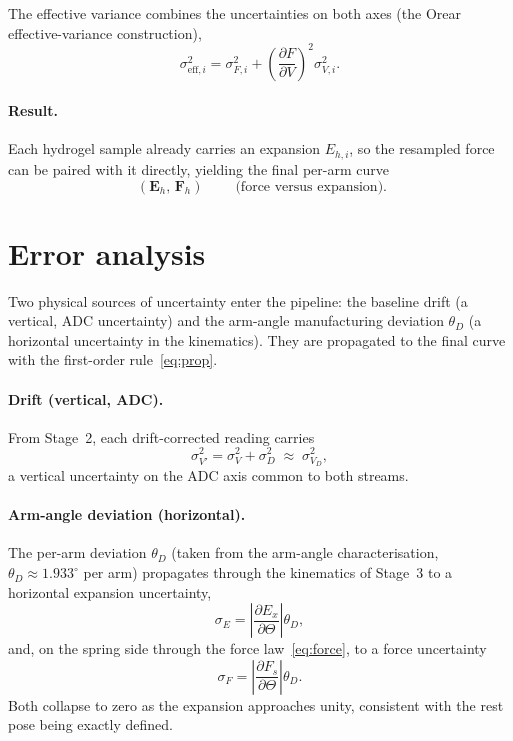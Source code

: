 \documentclass[11pt]{article}
\newcommand{\dset}[1]{\mathbf{#1}}          %
\newcommand{\unc}[1]{\sigma_{#1}}           %
\begin{document}
The effective variance combines the uncertainties on both axes (the Orear effective-variance
construction),
\begin{equation}
\sigma_{\mathrm{eff},i}^2=\sigma_{F,i}^2+\left(\frac{\partial F}{\partial V}\right)^{\!2}\sigma_{V,i}^2 .
\label{eq:seff}
\end{equation}

\paragraph{Result.}
Each hydrogel sample already carries an expansion $E_{h,i}$, so the resampled force can be
paired with it directly, yielding the final per-arm curve
\begin{equation}
\boxed{\;(\dset{E}_h,\,\dset{F}_h)\;}\qquad\text{(force versus expansion).}
\end{equation}

\section{Error analysis}
\label{sec:errors}
Two physical sources of uncertainty enter the pipeline: the baseline drift (a vertical, ADC
uncertainty) and the arm-angle manufacturing deviation $\theta_D$ (a horizontal uncertainty
in the kinematics). They are propagated to the final curve with the first-order
rule~\eqref{eq:prop}.

\paragraph{Drift (vertical, ADC).}
From Stage~2, each drift-corrected reading carries
\begin{equation}
\unc{V'}^2=\unc{V}^2+\unc{D}^2 \;\approx\; \unc{V_D}^2 ,
\end{equation}
a vertical uncertainty on the ADC axis common to both streams.

\paragraph{Arm-angle deviation (horizontal).}
The per-arm deviation $\theta_D$ (taken from the arm-angle characterisation,
$\theta_D\approx 1.933^{\circ}$ per arm) propagates through the kinematics of Stage~3 to a
horizontal expansion uncertainty,
\begin{equation}
\unc{E}=\left|\frac{\partial E_x}{\partial\Theta}\right|\theta_D,
\end{equation}
and, on the spring side through the force law~\eqref{eq:force}, to a force uncertainty
\begin{equation}
\unc{F}=\left|\frac{\partial F_s}{\partial\Theta}\right|\theta_D .
\end{equation}
Both collapse to zero as the expansion approaches unity, consistent with the rest pose being
exactly defined.
\end{document}
